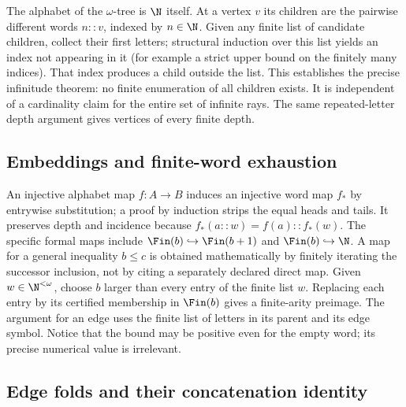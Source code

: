 The alphabet of the $\omega$-tree is $\N$ itself. At a vertex $v$ its children are the pairwise different words $n::v$, indexed by $n\in\N$. Given any finite list of candidate children, collect their first letters; structural induction over this list yields an index not appearing in it (for example a strict upper bound on the finitely many indices). That index produces a child outside the list. This establishes the precise infinitude theorem: no finite enumeration of all children exists. It is independent of a cardinality claim for the entire set of infinite rays. The same repeated-letter depth argument gives vertices of every finite depth.

\subsection{Embeddings and finite-word exhaustion}\label{supp:2-6}
\par{}\par\smallskip

An injective alphabet map $f:A\to B$ induces an injective word map $f_*$ by entrywise substitution; a proof by induction strips the equal heads and tails. It preserves depth and incidence because $f_*(a::w)=f(a)::f_*(w)$. The specific formal maps include $\Fin(b)\hookrightarrow\Fin(b+1)$ and $\Fin(b)\hookrightarrow\N$. A map for a general inequality $b\le c$ is obtained mathematically by finitely iterating the successor inclusion, not by citing a separately declared direct map. Given $w\in\N^{<\omega}$, choose $b$ larger than every entry of the finite list $w$. Replacing each entry by its certified membership in $\Fin(b)$ gives a finite-arity preimage. The argument for an edge uses the finite list of letters in its parent and its edge symbol. Notice that the bound may be positive even for the empty word; its precise numerical value is irrelevant.

\subsection{Edge folds and their concatenation identity}\label{supp:3-1}
\par{}\par\smallskip

